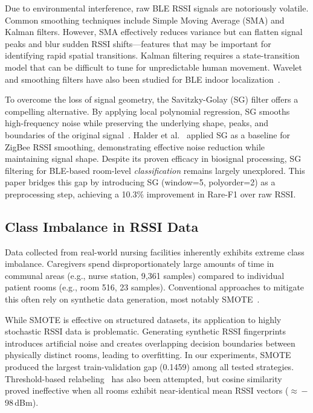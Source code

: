 \documentclass{iopconfser}
\begin{document}
Due to environmental interference, raw BLE RSSI signals are notoriously volatile. Common smoothing techniques include Simple Moving Average (SMA) and Kalman filters. However, SMA effectively reduces variance but can flatten signal peaks and blur sudden RSSI shifts---features that may be important for identifying rapid spatial transitions. Kalman filtering requires a state-transition model that can be difficult to tune for unpredictable human movement. Wavelet and smoothing filters have also been studied for BLE indoor localization~\cite{hou2017}.

To overcome the loss of signal geometry, the Savitzky-Golay (SG) filter offers a compelling alternative. By applying local polynomial regression, SG smooths high-frequency noise while preserving the underlying shape, peaks, and boundaries of the original signal~\cite{savitzky1964}. Halder et al.~\cite{halder2015} applied SG as a baseline for ZigBee RSSI smoothing, demonstrating effective noise reduction while maintaining signal shape. Despite its proven efficacy in biosignal processing, SG filtering for BLE-based room-level \emph{classification} remains largely unexplored. This paper bridges this gap by introducing SG (window=5, polyorder=2) as a preprocessing step, achieving a 10.3\% improvement in Rare-F1 over raw RSSI.

\subsection{Class Imbalance in RSSI Data}

Data collected from real-world nursing facilities inherently exhibits extreme class imbalance. Caregivers spend disproportionately large amounts of time in communal areas (e.g., nurse station, 9,361 samples) compared to individual patient rooms (e.g., room 516, 23 samples). Conventional approaches to mitigate this often rely on synthetic data generation, most notably SMOTE~\cite{chawla2002}.

While SMOTE is effective on structured datasets, its application to highly stochastic RSSI data is problematic. Generating synthetic RSSI fingerprints introduces artificial noise and creates overlapping decision boundaries between physically distinct rooms, leading to overfitting. In our experiments, SMOTE produced the largest train-validation gap (0.1459) among all tested strategies. Threshold-based relabeling~\cite{garcia2024} has also been attempted, but cosine similarity proved ineffective when all rooms exhibit near-identical mean RSSI vectors ($\approx$\,$-$98\,dBm).
\end{document}
